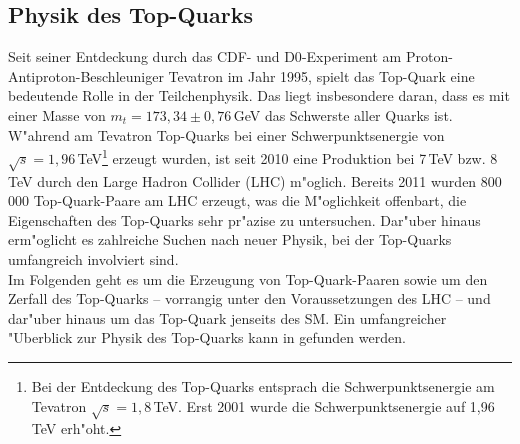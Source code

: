 \subsection{Physik des Top-Quarks}
\label{kaptop}
Seit seiner Entdeckung durch das CDF\cite{cdftopquark}- und D0\cite{d0topquark}-Experiment am Proton-Antiproton-Beschleuniger Tevatron im Jahr 1995, spielt das Top-Quark eine bedeutende Rolle in der Teilchenphysik. Das liegt insbesondere daran, dass es mit einer Masse von $m_{t}=173,34\pm 0,76$\,GeV \cite{ATLAS:2014wva} das Schwerste aller Quarks ist.\\
W"ahrend am Tevatron Top-Quarks bei einer Schwerpunkts\-energie von $\sqrt{s}=1,96$\,TeV\footnote{Bei der Entdeckung des Top-Quarks entsprach die Schwerpunkts\-energie am Tevatron $\sqrt{s}=1,8$\,TeV. Erst 2001 wurde die Schwerpunkts\-energie auf 1,96\,TeV erh"oht.} erzeugt wurden, ist seit 2010 eine Produktion bei 7\,TeV bzw. 8\,TeV durch den Large Hadron Collider (LHC) m"oglich. Bereits 2011 wurden 800\,000 Top-Quark-Paare am LHC erzeugt, was die M"oglichkeit offenbart, die Eigenschaften des Top-Quarks sehr pr"azise zu untersuchen. Dar"uber hinaus erm"oglicht es zahlreiche Suchen nach neuer Physik, bei der Top-Quarks umfangreich involviert sind.\\
Im Folgenden geht es um die Erzeugung von Top-Quark-Paaren sowie um den Zerfall des Top-Quarks -- vorrangig unter den Voraussetzungen des LHC -- und dar"uber hinaus um das Top-Quark jenseits des SM. Ein umfangreicher "Uberblick zur Physik des Top-Quarks kann in \cite{Bernreuther, Schilling} gefunden werden.


